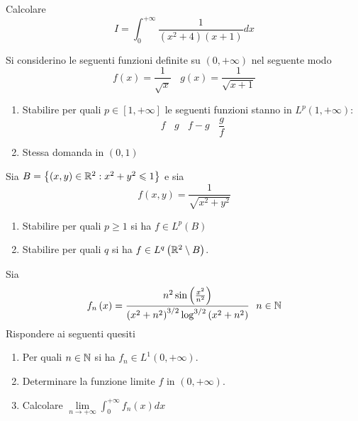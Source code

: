 Calcolare
\begin{equation*}
I=\int ^{+\infty }_{0}\frac{1}{\left( x^{2} +4\right)\left( x+1\right)} dx
\end{equation*}

Si considerino le seguenti funzioni definite su $\left( 0,+\infty \right)$ nel seguente modo
\begin{equation*}
f\left( x\right) =\frac{1}{\sqrt{x}} \ \ \ \ g\left( x\right) =\frac{1}{\sqrt{x+1}}
\end{equation*}
\begin{enumerate}
\item Stabilire per quali $p\in \left[ 1,+\infty \right]$ le seguenti funzioni stanno in $L^{p}\left( 1,+\infty \right)$:\begin{equation*}
f\ \ \ \ g\ \ \ \ f-g\ \ \ \ \frac{g}{f}
\end{equation*}
\item Stessa domanda in $\left( 0,1\right)$
\end{enumerate}
\Esercizio{ }

Sia $B=\left\{\left( x,y\right) \in \mathbb{R} ^{2} :x^{2} +y^{2} \leqslant 1\right\}$ e sia
\begin{equation*}
f\left( x,y\right) =\frac{1}{\sqrt{x^{2} +y^{2}}}
\end{equation*}
\begin{enumerate}
\item Stabilire per quali $p\geqslant 1$ si ha $f\in L^{p}\left( B\right)$
\item Stabilire per quali $q$ si ha $f\in L^{q}\left(\mathbb{R} ^{2} \setminus B\right)$.
\end{enumerate}
\Esercizio{}

Sia
\begin{equation*}
f_{n}\left( x\right) =\frac{n^{2}\sin\left(\frac{x^{2}}{n^{2}}\right)}{\left( x^{2} +n^{2}\right)^{3/2}\log^{3/2}\left( x^{2} +n^{2}\right)} \ \ n\in \mathbb{N} 
\end{equation*}
Rispondere ai seguenti quesiti
\begin{enumerate}
\item Per quali $n\in \mathbb{N} $ si ha $f_{n} \in L^{1}\left( 0,+\infty \right)$.
\item Determinare la funzione limite $f$ in $\left( 0,+\infty \right)$.
\item Calcolare $\lim\limits _{n\rightarrow +\infty }\int ^{+\infty }_{0} f_{n}\left( x\right) dx$
\end{enumerate}
\Esercizio{}

